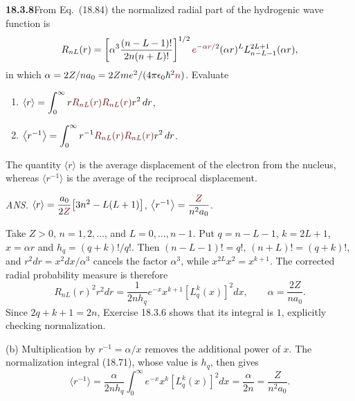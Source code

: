 \par\bigskip
\noindent\textbf{18.3.8}\quad From Eq.~(18.84) the normalized radial
part of the hydrogenic wave function is
\[
R_{nL}(r)=\left[\alpha^{3}\frac{(n-L-1)!}{2n(n+L)!}\right]^{1/2}
\erratum{e^{-\alpha r/2}}(\alpha r)^{L}L_{n-L-1}^{2L+1}(\alpha r),
\]
in which $\alpha=2Z/na_{0}=2Zme^{2}/(4\pi\epsilon_{0}\hbar^{2}\erratum{n})$.
Evaluate
\begin{enumerate}
\item[(a)] $\langle r\rangle
=\displaystyle\int_{0}^{\infty}r\erratum{R_{nL}(r)R_{nL}(r)}
r^{2}\,dr$,
\item[(b)] $\big\langle r^{-1}\big\rangle
=\displaystyle\int_{0}^{\infty}r^{-1}\erratum{R_{nL}(r)R_{nL}(r)}
r^{2}\,dr$.
\end{enumerate}
The quantity $\langle r\rangle$ is the average displacement of the
electron from the nucleus, whereas $\langle r^{-1}\rangle$ is the
average of the reciprocal displacement.
\par\nobreak\hfill\emph{ANS.}\enspace
$\langle r\rangle=\dfrac{a_{0}}{2\erratum{Z}}\big[3n^{2}-L(L+1)\big]$,\qquad
$\big\langle r^{-1}\big\rangle=\dfrac{\erratum{Z}}{n^{2}a_{0}}$.
\par\nobreak
\solution
{}
Take $Z>0$, $n=1,2,\ldots$, and $L=0,\ldots,n-1$.
Put $q=n-L-1$, $k=2L+1$, $x=\alpha r$ and
$h_q=(q+k)!/q!$.  Then $(n-L-1)!=q!$, $(n+L)!=(q+k)!$, and
$r^2dr=x^2dx/\alpha^3$ cancels the factor $\alpha^3$, while
$x^{2L}x^2=x^{k+1}$.  The corrected radial probability measure is
therefore
\[
R_{nL}(r)^2r^2dr
 =\frac1{2nh_q}e^{-x}x^{k+1}[L_q^k(x)]^2dx,
\qquad \alpha=\frac{2Z}{na_0}.
\]
Since $2q+k+1=2n$, Exercise 18.3.6 shows that its integral is
$1$, explicitly checking normalization.

(b) Multiplication by $r^{-1}=\alpha/x$ removes the additional
power of $x$.  The normalization integral (18.71), whose value is
$h_q$, then gives
\[
\langle r^{-1}\rangle
 =\frac\alpha{2nh_q}\int_0^\infty e^{-x}x^k[L_q^k(x)]^2dx
 =\frac\alpha{2n}
 =\boxed{\frac{Z}{n^2a_0}}.
\]


